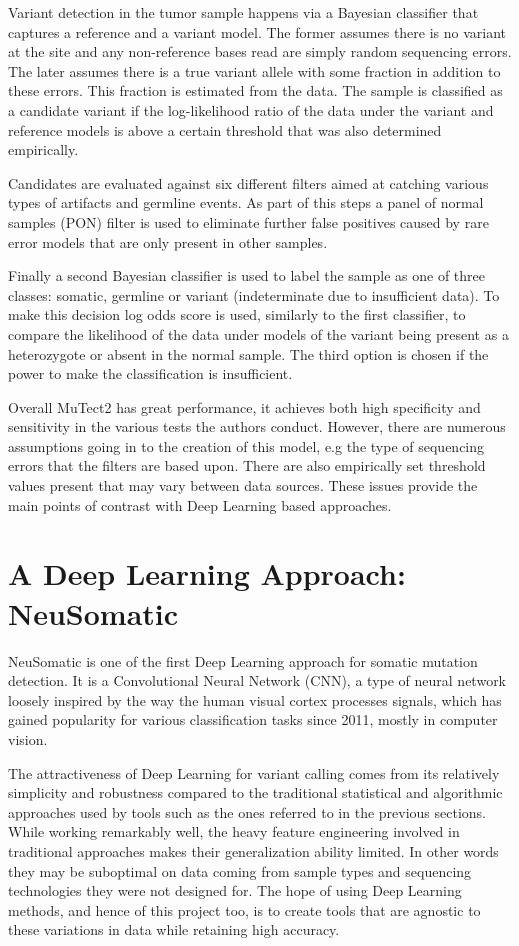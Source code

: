 \documentclass[bsc,frontabs,singlespacing,parskip,deptreport]{infthesis}
\begin{document}
Variant detection in the tumor sample happens via a Bayesian classifier that captures a reference and a variant model. The former assumes there is no variant at the site and any non-reference bases read are simply random sequencing errors. The later assumes there is a true variant allele with some fraction in addition to these errors. This fraction is estimated from the data. The sample is classified as a candidate variant if the log-likelihood ratio of the data under the variant and reference models is above a certain threshold that was also determined empirically.

Candidates are evaluated against six different filters aimed at catching various types of artifacts and germline events. As part of this steps a panel of normal samples (PON) filter is used to eliminate further false positives caused by rare error models that are only present in other samples.

Finally a second Bayesian classifier is used to label the sample as one of three classes: somatic, germline or variant (indeterminate due to insufficient data). To make this decision log odds score is used, similarly to the first classifier, to compare the likelihood of the data under models of the variant being present as a heterozygote or absent in the normal sample. The third option is chosen if the power to make the classification is insufficient.

Overall MuTect2 has great performance, it achieves both high specificity and sensitivity in the various tests the authors conduct. However, there are numerous assumptions going in to the creation of this model, e.g the type of sequencing errors that the filters are based upon. There are also empirically set threshold values present that may vary between data sources. These issues provide the main points of contrast with Deep Learning based approaches.

\section{A Deep Learning Approach: NeuSomatic}

NeuSomatic \cite{neusomatic} is one of the first Deep Learning approach for somatic mutation detection. It is a Convolutional Neural Network (CNN), a type of neural network loosely inspired by the way the human visual cortex processes signals, which has gained popularity for various classification tasks since 2011, mostly in computer vision.

The attractiveness of Deep Learning for variant calling comes from its relatively simplicity and robustness compared to the traditional statistical and algorithmic approaches used by tools such as the ones referred to in the previous sections. While working remarkably well, the heavy feature engineering involved in traditional approaches makes their generalization ability limited. In other words they may be suboptimal on data coming from sample types and sequencing technologies they were not designed for. The hope of using Deep Learning methods, and hence of this project too, is to create tools that are agnostic to these variations in data while retaining high accuracy.
\end{document}
